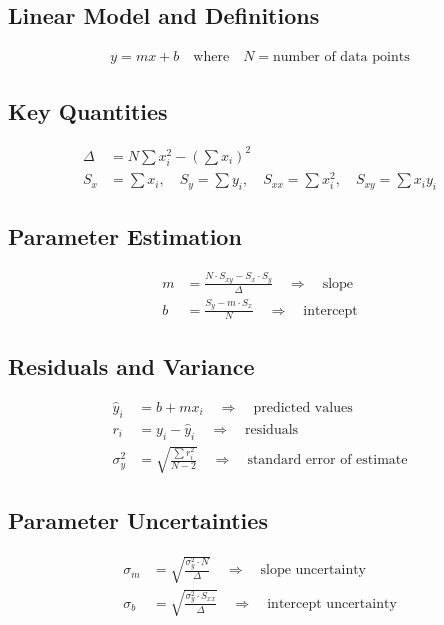 \documentclass{article} %
\begin{document}
\subsection*{Linear Model and Definitions}
\begin{align*}
y = mx + b \quad \text{where} \quad N = \text{number of data points}
\end{align*}

\subsection*{Key Quantities}
\begin{align*}
\Delta &= N \sum x_i^2 - \left(\sum x_i\right)^2 \\
S_x &= \sum x_i, \quad S_y = \sum y_i, \quad S_{xx} = \sum x_i^2, \quad S_{xy} = \sum x_i y_i
\end{align*}

\subsection*{Parameter Estimation}
\begin{align*}
m &= \frac{N \cdot S_{xy} - S_x \cdot S_y}{\Delta} \quad \Rightarrow \quad \text{slope} \\
b &= \frac{S_y - m \cdot S_x}{N} \quad \Rightarrow \quad \text{intercept}
\end{align*}

\subsection*{Residuals and Variance}
\begin{align*}
\hat{y}_i &= b + m x_i \quad \Rightarrow \quad \text{predicted values} \\
r_i &= y_i - \hat{y}_i \quad \Rightarrow \quad \text{residuals} \\
\sigma_y^2 &= \sqrt{\frac{\sum r_i^2}{N-2}} \quad \Rightarrow \quad \text{standard error of estimate}
\end{align*}

\subsection*{Parameter Uncertainties}
\begin{align*}
\sigma_m &= \sqrt{\frac{\sigma_y^2 \cdot N}{\Delta}} \quad \Rightarrow \quad \text{slope uncertainty} \\
\sigma_b &= \sqrt{\frac{\sigma_y^2 \cdot S_{xx}}{\Delta}} \quad \Rightarrow \quad \text{intercept uncertainty}
\end{align*}
\end{document}
